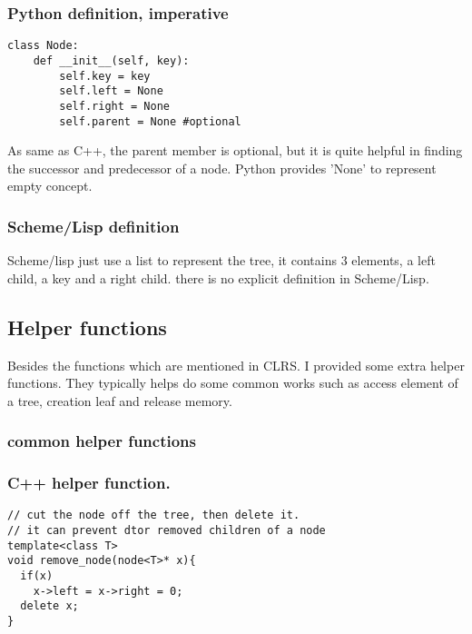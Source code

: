 \documentclass{article}
\begin{document}
\subsubsection*{Python definition, imperative}
\lstset{language=Python}
\begin{lstlisting}
class Node:
    def __init__(self, key):
        self.key = key
        self.left = None
        self.right = None
        self.parent = None #optional
\end{lstlisting}

As same as C++, the parent member is optional, but it is quite helpful
in finding the successor and predecessor of a node. Python provides
'None' to represent empty concept.

\subsubsection*{Scheme/Lisp definition}
Scheme/lisp just use a list to represent the tree, it contains 3 elements,
a left child, a key and a right child. there is no explicit definition
in Scheme/Lisp.

\subsection{Helper functions} \label{helper-fun}

Besides the functions which are mentioned in CLRS\cite{CLRS}. I provided some
extra helper functions. They typically helps do some common works such as 
access element of a tree, creation leaf and release memory.

\subsubsection{common helper functions}

\subsubsection*{C++ helper function.}
\lstset{language=C++}
\begin{lstlisting}
// cut the node off the tree, then delete it.
// it can prevent dtor removed children of a node
template<class T>
void remove_node(node<T>* x){
  if(x)
    x->left = x->right = 0;
  delete x;
}
\end{lstlisting}
\end{document}
